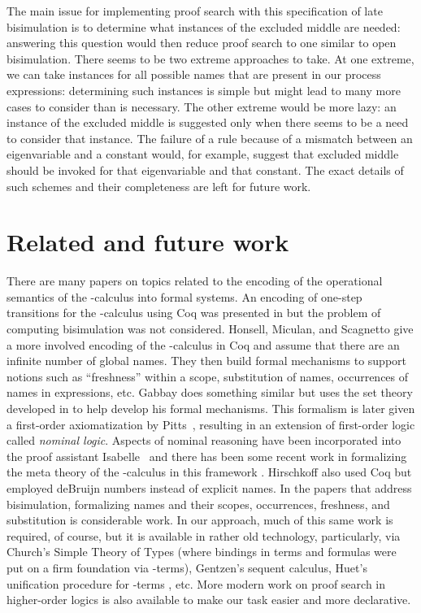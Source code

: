 \documentclass{acmtrans2m}
\begin{document}
The main issue for implementing proof search with this specification
of late bisimulation is to determine what instances of the excluded
middle are needed: answering this question would then reduce proof
search to one similar to open bisimulation.  There seems to be two
extreme approaches to take. At one extreme, we can take instances for
all possible names that are present in our process expressions:
determining such instances is simple but might lead to many more cases
to consider than is necessary.  The other extreme would be more lazy:
an instance of the excluded middle is suggested only when there seems
to be a need to consider that instance.  The failure of a  rule
because of a mismatch between an eigenvariable and
a constant would, for example, suggest that excluded middle should be
invoked for that eigenvariable and that constant.  The exact details
of such schemes and their completeness are left for future work.


\section{Related and future work}
\label{sec:related}

There are many papers on topics related to the encoding of the
operational semantics of the -calculus into formal systems.  An
encoding of one-step transitions for the -calculus using Coq was
presented in \cite{despeyroux00ifiptcs} but the problem of computing
bisimulation was not considered.  Honsell, Miculan, and Scagnetto
\cite{honsell01tcs} give a more involved encoding of the
-calculus in Coq and assume that there are an infinite number of
global names.  They then build formal mechanisms to support notions
such as ``freshness'' within a scope, substitution of names,
occurrences of names in expressions, etc.  Gabbay
\cite{gabbay03automath} does something similar but uses the
set theory developed in \cite{gabbay01fac} to help develop his formal
mechanisms.  This formalism is later given a first-order axiomatization by
Pitts~\cite{pitts03ic}, resulting in an extension of first-order logic called 
{\em nominal logic}.  Aspects of nominal reasoning have been incorporated
into the proof assistant Isabelle~\cite{urban05cade} and there has been
some recent work in formalizing the meta theory of the -calculus
in this framework \cite{bengtson07fossacs}.
Hirschkoff \cite{hirschkoff97tphol} also used Coq but
employed deBruijn numbers \cite{debruijn72} instead of explicit names.
In the papers that address bisimulation, formalizing names and their
scopes, occurrences, freshness, and substitution is considerable work.
In our approach, much of this same work is required, of course, but it
is available in rather old technology, particularly, via Church's
Simple Theory of Types (where bindings in terms and formulas were put
on a firm foundation via -terms), Gentzen's sequent calculus,
Huet's unification procedure for -terms \cite{huet75tcs},
etc.  More modern work on proof search in higher-order logics is also
available to make our task easier and more declarative.
\end{document}
